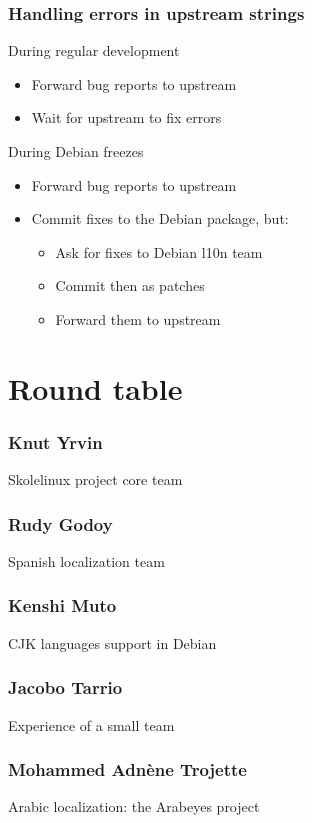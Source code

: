 \documentclass{beamer}
\begin{document}
\begin{frame}
  \frametitle{Handling errors in upstream strings}
	\begin{block}
		{During regular development}
		\begin{itemize}
		\item
			Forward bug reports to upstream
		\item
			Wait for upstream to fix errors
		\end{itemize}
	\end{block}
	\begin{block}
		{During Debian freezes}
		\begin{itemize}
		\item
			Forward bug reports to upstream
		\item
			Commit fixes to the Debian package, but:
			\begin{itemize}
			\item
				Ask for fixes to Debian l10n team
			\item
				Commit then as patches
			\item
				Forward them to upstream
			\end{itemize}
		\end{itemize}
	\end{block}
\end{frame}

\section{Round table}

\begin{frame}
  \frametitle{Knut Yrvin}
	\begin{block}
		{Skolelinux project core team}
	\end{block}
\end{frame}

\begin{frame}
  \frametitle{Rudy Godoy}
	\begin{block}
		{Spanish localization team}
	\end{block}
\end{frame}

\begin{frame}
  \frametitle{Kenshi Muto}
	\begin{block}
		{CJK languages support in Debian}
	\end{block}
\end{frame}

\begin{frame}
  \frametitle{Jacobo Tarrio}
	\begin{block}
		{Experience of a small team}
	\end{block}
\end{frame}

\begin{frame}
  \frametitle{Mohammed Adnène Trojette}
	\begin{block}
		{Arabic localization: the Arabeyes project}
	\end{block}
\end{frame}
\end{document}
